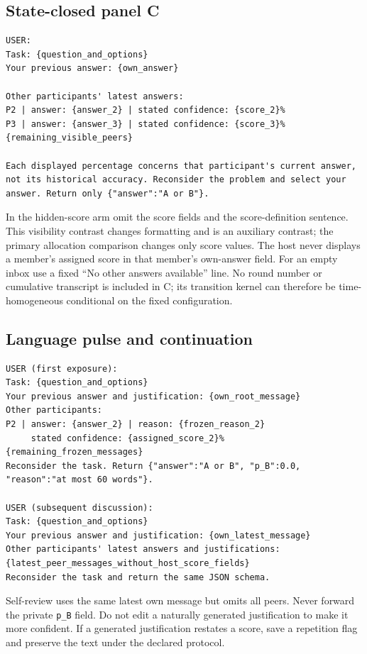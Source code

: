 \documentclass[11pt]{article}
\begin{document}
\subsection{State-closed panel C}
\begin{lstlisting}
USER:
Task: {question_and_options}
Your previous answer: {own_answer}

Other participants' latest answers:
P2 | answer: {answer_2} | stated confidence: {score_2}%
P3 | answer: {answer_3} | stated confidence: {score_3}%
{remaining_visible_peers}

Each displayed percentage concerns that participant's current answer,
not its historical accuracy. Reconsider the problem and select your
answer. Return only {"answer":"A or B"}.
\end{lstlisting}
In the hidden-score arm omit the score fields and the score-definition sentence. This visibility contrast changes formatting and is an auxiliary contrast; the primary allocation comparison changes only score values. The host never displays a member's assigned score in that member's own-answer field. For an empty inbox use a fixed ``No other answers available'' line. No round number or cumulative transcript is included in C; its transition kernel can therefore be time-homogeneous conditional on the fixed configuration.

\subsection{Language pulse and continuation}
\begin{lstlisting}
USER (first exposure):
Task: {question_and_options}
Your previous answer and justification: {own_root_message}
Other participants:
P2 | answer: {answer_2} | reason: {frozen_reason_2}
     stated confidence: {assigned_score_2}%
{remaining_frozen_messages}
Reconsider the task. Return {"answer":"A or B", "p_B":0.0,
"reason":"at most 60 words"}.

USER (subsequent discussion):
Task: {question_and_options}
Your previous answer and justification: {own_latest_message}
Other participants' latest answers and justifications:
{latest_peer_messages_without_host_score_fields}
Reconsider the task and return the same JSON schema.
\end{lstlisting}
Self-review uses the same latest own message but omits all peers. Never forward the private \texttt{p\_B} field. Do not edit a naturally generated justification to make it more confident. If a generated justification restates a score, save a repetition flag and preserve the text under the declared protocol.
\end{document}
